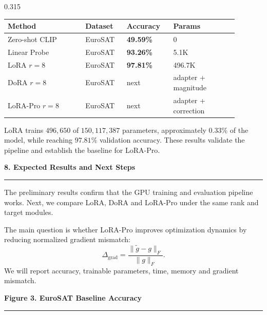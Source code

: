 \documentclass[final]{beamer}
\newcommand{\sectiontitle}[1]{%
  \vspace{0.45em}%
  {\Large\bfseries\color{titleblue}#1}\par
  \vspace{0.10em}%
  {\color{rulegray}\rule{\linewidth}{0.9pt}}\par
  \vspace{0.22em}%
}
\begin{document}
\begin{frame}[t]
\begin{columns}[t,totalwidth=\textwidth]
\begin{column}{0.315\textwidth}
\begin{center}
\begin{tabular}{p{0.30\linewidth}p{0.16\linewidth}p{0.18\linewidth}p{0.25\linewidth}}
\toprule
Method & Dataset & Accuracy & Params \\
\midrule
Zero-shot CLIP & EuroSAT & \textbf{49.59\%} & 0 \\
Linear Probe & EuroSAT & \textbf{93.26\%} & 5.1K \\
LoRA $r=8$ & EuroSAT & \textbf{97.81\%} & 496.7K \\
\midrule
DoRA $r=8$ & EuroSAT & next & adapter + magnitude \\
LoRA-Pro $r=8$ & EuroSAT & next & adapter + correction \\
\bottomrule
\end{tabular}
\end{center}

{\small
LoRA trains \(496{,}650\) of \(150{,}117{,}387\) parameters, approximately
\(0.33\%\) of the model, while reaching \(97.81\%\) validation accuracy. These
results validate the pipeline and establish the baseline for LoRA-Pro.
}

\sectiontitle{8. Expected Results and Next Steps}
The preliminary results confirm that the GPU training and evaluation pipeline
works. Next, we compare LoRA, DoRA and LoRA-Pro under the same rank and target
modules.

The main question is whether LoRA-Pro improves optimization dynamics by reducing
normalized gradient mismatch:
\[
  \Delta_{\mathrm{grad}}=\frac{\|\widetilde g-g\|_F}{\|g\|_F}.
\]
We will report accuracy, trainable parameters, time, memory and gradient
mismatch.

\sectiontitle{Figure 3. EuroSAT Baseline Accuracy}

\begin{center}
\end{center}
\end{column}
\end{columns}
\end{frame}
\end{document}
